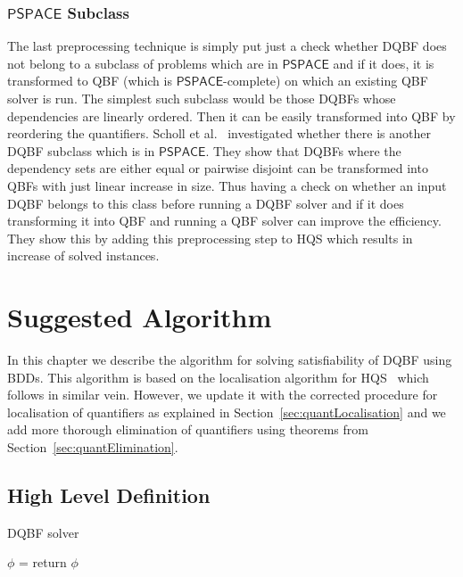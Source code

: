 \documentclass[
  digital, %
  color,
  twoside, %
  table,   %
  nolof,     %
  nolot,     %
]{fithesis3}
\theoremstyle{definition}
\theoremstyle{remark}
\newcommand{\ComplexityFont}[1]{\mathsf{#1}}
\newcommand{\PSPACE}{\ComplexityFont{PSPACE}}
\begin{document}
\subsection{\texorpdfstring{$\PSPACE$}{PSPACE} Subclass}
\label{sec:prepro:pspacesubclass}
The last preprocessing technique is simply put just a check whether DQBF does not belong to a subclass of problems which are in $\PSPACE$ and if it does, it is transformed to QBF (which is $\PSPACE$-complete) on which an existing QBF solver is run. The simplest such subclass would be those DQBFs whose dependencies are linearly ordered. Then it can be easily transformed into QBF by reordering the quantifiers. Scholl et al.~\cite{PSPACEsubclass} investigated whether there is another DQBF subclass which is in $\PSPACE$. They show that DQBFs where the dependency sets are either equal or pairwise disjoint can be transformed into QBFs with just linear increase in size. Thus having a check on whether an input DQBF belongs to this class before running a DQBF solver and if it does transforming it into QBF and running a QBF solver can improve the efficiency. They show this by adding this preprocessing step to HQS which results in increase of solved instances.

\chapter{Suggested Algorithm}
\label{chap:algorithm}

In this chapter we describe the algorithm for solving satisfiability of DQBF using BDDs. This algorithm is based on the localisation algorithm for HQS~\cite{HQSquantifierLocalisation} which follows in similar vein. However, we update it with the corrected procedure for localisation of quantifiers as explained in Section~\ref{sec:quantLocalisation} and we add more thorough elimination of quantifiers using theorems from Section~\ref{sec:quantElimination}.

\section{High Level Definition}
\begin{algorithm}
  \caption{DQBF solver}
  \label{alg:general}
  \begin{algorithmic}[1]
    \State {}
    \State $\phi$ = 
    \State {} \label{alg:general:elimination}
    \State return $\phi$
    \EndFunction
  \end{algorithmic}
\end{algorithm}
\end{document}
